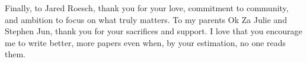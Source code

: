 Finally, to Jared Roesch, thank you for your love, commitment to community,
and ambition to focus on what truly matters. To my parents Ok Za Julie and Stephen Jun,
thank you for your sacrifices and support. I love that you
encourage me to write better, more papers even when, by your estimation,
no one reads them.
















